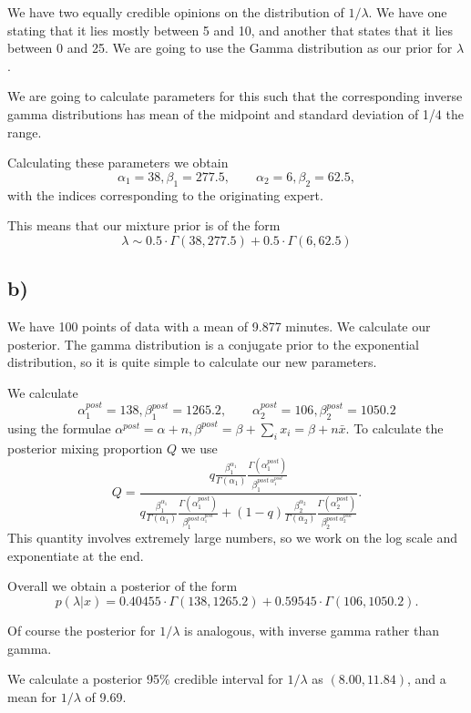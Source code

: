 \documentclass[10pt]{extarticle}
\begin{document}
We have two equally credible opinions on the distribution of $1/\lambda$. We have one stating that it lies mostly between 5 and 10, and another that states that it lies between 0 and 25. We are going to use the Gamma distribution as our prior for $\lambda$. 

We are going to calculate parameters for this such that the corresponding inverse gamma distributions has mean of the midpoint and standard deviation of 1/4 the range. 

Calculating these parameters we obtain 
\[
\alpha_1 = 38, \beta_1 = 277.5, \qquad \alpha_2 = 6, \beta_2 = 62.5,
\]
with the indices corresponding to the originating expert.

This means that our mixture prior is of the form 
\[
\lambda \sim 0.5\cdot\Gamma(38, 277.5) + 0.5\cdot\Gamma(6, 62.5)
\]

\subsection*{b)}

We have 100 points of data with a mean of 9.877 minutes. We calculate our posterior. The gamma distribution is a conjugate prior to the exponential distribution, so it is quite simple to calculate our new parameters. 

We calculate 
\[
\alpha_1^{post} = 138, \beta_1^{post} = 1265.2, \qquad \alpha_2^{post} = 106, \beta_2^{post} = 1050.2
\] using the formulae $\alpha^{post} = \alpha + n, \beta^{post} = \beta + \sum_i x_i = \beta + n\bar{x}.$ To calculate the posterior mixing proportion $Q$ we use \[Q = \frac{q\frac{\beta_1^{\alpha_1}}{\Gamma(\alpha_1)}\frac{\Gamma(\alpha_1^{post})}{\beta_1^{post \ \alpha_1^{post}}}}{q\frac{\beta_1^{\alpha_1}}{\Gamma(\alpha_1)}\frac{\Gamma(\alpha_1^{post})}{\beta_1^{post \ \alpha_1^{post}}} + (1-q)\frac{\beta_2^{\alpha_2}}{\Gamma(\alpha_2)}\frac{\Gamma(\alpha_2^{post})}{\beta_2^{post \ \alpha_2^{post}}}}.\]
This quantity involves extremely large numbers, so we work on the log scale and exponentiate at the end. 

Overall we obtain a posterior of the form
\[
p(\lambda|x) = 0.40455 \cdot \Gamma(138, 1265.2) + 0.59545 \cdot \Gamma(106, 1050.2). 
\]

Of course the posterior for $1/\lambda$ is analogous, with inverse gamma rather than gamma.

We calculate a posterior 95\% credible interval for $1/\lambda$ as $(8.00, 11.84)$, and a mean for $1/\lambda$ of 9.69.
\end{document}
